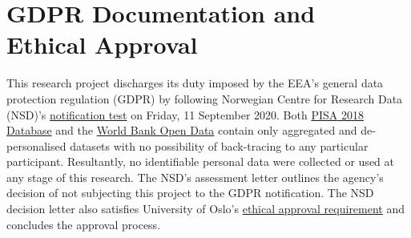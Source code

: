 \chapter[GDPR Documentation and Ethical Approval]{GDPR Documentation and\\Ethical Approval} %


This research project discharges its duty imposed by the \textsc{EEA}'s general data protection regulation (\textsc{GDPR}) by following Norwegian Centre for Research Data (\textsc{NSD})'s \href{https://nsd.no/personvernombud/en/notify/notification_test.html}{notification test} on Friday, 11 September 2020. Both \href{https://www.oecd.org/pisa/data/2018database/}{\textsc{PISA} 2018 Database} and the \href{https://data.worldbank.org/}{World Bank Open Data} contain only aggregated and de-personalised datasets with no possibility of back-tracing to any particular participant. Resultantly, no identifiable personal data were collected or used at any stage of this research. The \textsc{NSD}'s assessment letter outlines the agency's decision of not subjecting this project to the \textsc{GDPR} notification. The \textsc{NSD} decision letter also satisfies University of Oslo's \href{https://www.uio.no/english/for-employees/support/research/funding/units/hf/imv/data-ethics/}{ethical approval requirement} and concludes the approval process.





